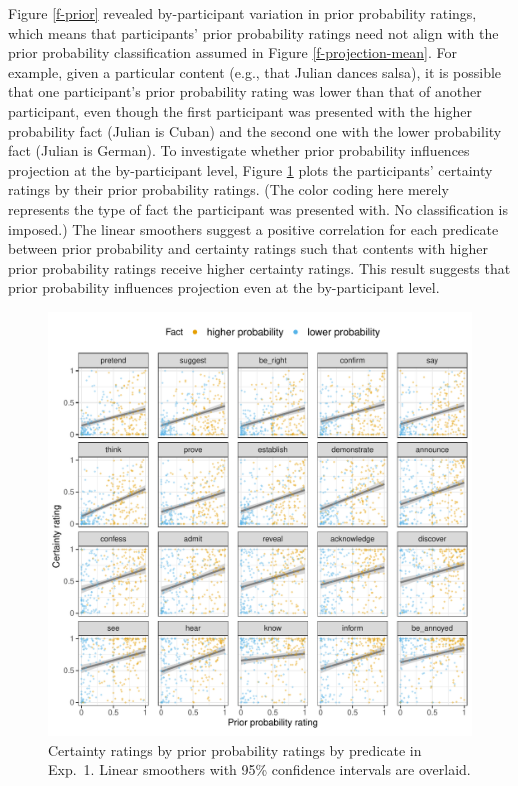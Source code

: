 \documentclass[11pt,fleqn]{article}
\newcommand{\6}{\mbox{$[\hspace*{-.6mm}[$}}
\newcommand{\9}{\mbox{$]\hspace*{-.6mm}]$}}
\begin{document}
Figure \ref{f-prior} revealed by-participant variation in prior probability ratings, which means that participants' prior probability ratings need not align with the prior probability classification assumed in Figure \ref{f-projection-mean}. For example, given a particular content (e.g., that Julian dances salsa), it is possible that one participant's prior probability rating was lower than that of another participant, even though the first participant was presented with the higher probability fact (Julian is Cuban) and the second one with the lower probability fact (Julian is German). To investigate whether prior probability influences projection at the by-participant level, Figure \ref{f-projection} plots the participants' certainty ratings by their prior probability ratings. (The color coding here merely represents the type of fact the participant was presented with. No classification is imposed.) The linear smoothers suggest a positive correlation for each predicate between prior probability and certainty ratings such that contents with higher prior probability ratings receive higher certainty ratings. This result suggests that prior probability influences projection even at the by-participant level.

\begin{figure}[h!]
\centering

\includegraphics[width=.7\paperwidth]{../../results/9-prior-projection/graphs/projection-by-prior}

\caption{Certainty ratings by prior probability ratings by predicate in Exp.~1. Linear smoothers with 95\% confidence intervals are overlaid.}
\label{f-projection}
\end{figure}
\end{document}
